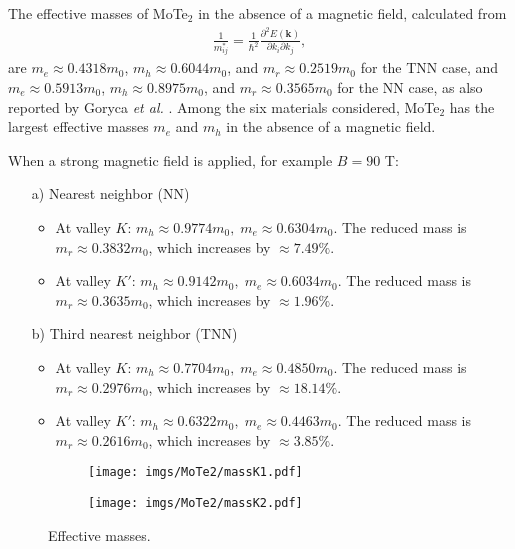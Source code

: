 \documentclass{article}
\begin{document}
The effective masses of MoTe$_{2}$ in the absence of a magnetic field, calculated from
\begin{gather}
	\frac{1}{m_{ij}^{*}} = \frac{1}{\hbar^{2}} \frac{\partial^{2} E(\mathbf{k})}{\partial k_{i}\partial k_{j}},
\end{gather}
are $m_{e} \approx 0.4318 m_{0}$, $m_{h} \approx 0.6044 m_{0}$, and $m_{r} \approx 0.2519 m_{0}$ for the TNN case, and $m_{e} \approx 0.5913 m_{0}$, $m_{h} \approx 0.8975 m_{0}$, and $m_{r} \approx 0.3565 m_{0}$ for the NN case, as also reported by Goryca \textit{et al.} \cite{goryca2019}. Among the six materials considered, MoTe$_{2}$ has the largest effective masses $m_{e}$ and $m_{h}$ in the absence of a magnetic field.

When a strong magnetic field is applied, for example $B = 90$ T:

\begin{itemize}
	\item[a)] Nearest neighbor (NN)
	      \begin{itemize}
		      \item At valley $K$: $m_{h} \approx 0.9774 m_{0},\; m_{e} \approx 0.6304 m_{0}$.
		            The reduced mass is $m_{r} \approx 0.3832 m_{0}$, which increases by $\approx 7.49\%$.

		      \item At valley $K'$: $m_{h} \approx 0.9142 m_{0},\; m_{e} \approx 0.6034 m_{0}$.
		            The reduced mass is $m_{r} \approx 0.3635 m_{0}$, which increases by $\approx 1.96\%$.
	      \end{itemize}
	\item[b)] Third nearest neighbor (TNN)
	      \begin{itemize}
		      \item At valley $K$: $m_{h} \approx 0.7704 m_{0},\; m_{e} \approx 0.4850 m_{0}$.
		            The reduced mass is $m_{r} \approx 0.2976 m_{0}$, which increases by $\approx 18.14\%$.

		      \item At valley $K'$: $m_{h} \approx 0.6322 m_{0},\; m_{e} \approx 0.4463 m_{0}$.
		            The reduced mass is $m_{r} \approx 0.2616 m_{0}$, which increases by $\approx 3.85\%$.
	      \end{itemize}
\end{itemize}

\begin{figure}[htb]
	\begin{subfigure}{0.495\textwidth}
		\centering
		\texttt{[image: imgs/MoTe2/massK1.pdf]}
	\end{subfigure}
	\begin{subfigure}{0.495\textwidth}
		\centering
		\texttt{[image: imgs/MoTe2/massK2.pdf]}
	\end{subfigure}
	\caption{Effective masses.}
\end{figure}
\end{document}
